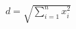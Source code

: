 \documentclass[preview]{standalone}
\begin{document}
\begin{align*}
d = \sqrt{\sum_{i=1}^{n} x_i^2}
\end{align*}
\end{document}

